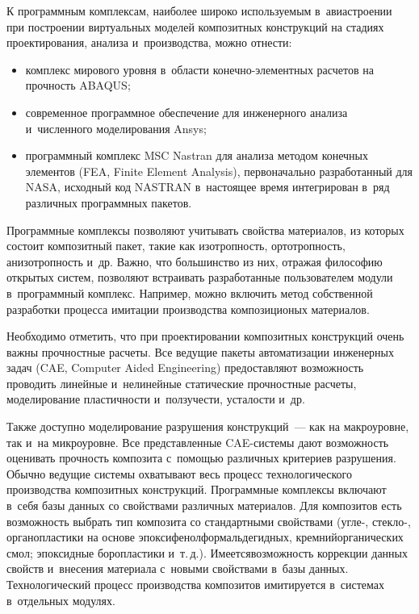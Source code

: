 \begin{multicols}{2}
     К программным комплексам, наиболее широко ис\-поль\-зу\-емым 
в~авиастроении при построении виртуальных моделей композитных конструкций 
на стадиях проектирования, анализа и~производства, можно отнести: 
     \begin{itemize}
     \item комплекс мирового уровня в~области ко\-неч\-но-эле\-мент\-ных расчетов на 
прочность ABAQUS; 
     \item современное программное обеспечение для инженерного анализа 
и~численного моделирования Ansys; 
     \item программный комплекс MSC Nastran для анализа методом конечных 
элементов (FEA, Finite Element Analysis), первоначально разработанный для NASA, исходный код 
NASTRAN в~настоящее время интегрирован в~ряд различных программных 
пакетов.
     \end{itemize}
     
     Программные комплексы позволяют учитывать свойства материалов, из 
которых состоит композитный пакет, такие как изотропность, ортотропность, 
анизотропность и~др. Важно, что большинство из них, отражая философию 
открытых сис\-тем, позволяют встраивать разработанные пользователем модули 
в~программный комплекс. Например, можно включить метод собственной 
разработки процесса имитации производства композиционых материалов. 
     
     Необходимо отметить, что при проектировании композитных конструкций 
очень важ\-ны прочностные расчеты. Все ведущие пакеты автоматизации 
инженерных задач (CAE, Computer Aided Engineering) предоставляют 
возможность проводить линейные и~нелинейные статические прочностные 
расчеты, моделирование пластичности и~пол\-зу\-чес\-ти, усталости и~др.
     
     Также доступно моделирование разрушения конструкций~--- как на 
макроуровне, так и~на мик\-ро\-уров\-не. Все пред\-став\-лен\-ные CAE-сис\-те\-мы дают 
возможность оценивать проч\-ность композита с~помощью различных критериев 
разрушения. Обычно ведущие сис\-те\-мы охватывают весь процесс 
технологического производства композитных конструкций. Программные 
комплексы включают в~себя базы данных со свойствами различных материалов. 
Для композитов есть возможность выбрать тип композита со стандартными 
свойствами (уг\-ле-, стек\-ло-, органопластики на основе 
эпоксифенолформальдегидных, кремнийорганических смол; эпоксидные 
боропластики и~т.\,д.). Имеется\linebreak возможность коррекции данных свойств 
и~внесения материала с~новыми свойствами в~базы данных. Технологический 
процесс производства композитов имитируется в~сис\-те\-мах в~отдельных%
модулях.
{ %

}
\end{multicols}

